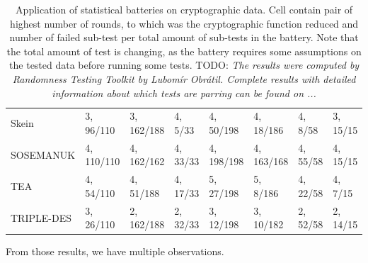 \documentclass[
  print, %
  Table,   %
  nolof,     %
  nolot,     %
  11pt, %
  oneside  %
]{fithesis3}
\newcommand{\todo}[1]{TODO: \textit{#1}}
\begin{document}
\begin{table}[H]
\begin{tabular}{l|p{1.8cm} p{1.8cm} p{1.8cm} p{1.8cm} p{1.8cm} p{1.8cm} p{1.8cm}}
Skein       & 3, 96/110 & 3, 162/188& 4, 5/33           & 4, 50/198                 & 4, 18/186     & 4, 8/58           & 3, 15/15              \\
SOSEMANUK   & 4, 110/110& 4, 162/162& 4, 33/33          & 4, 198/198                & 4, 163/168    & 4, 55/58          & 4, 15/15              \\
TEA         & 4, 54/110 & 4, 51/188 & 4, 17/33          & 5, 27/198                 & 5, 8/186      & 4, 22/58          & 4, 7/15               \\
TRIPLE-DES  & 3, 26/110 & 2, 162/188& 2, 32/33          & 3, 12/198                 & 3, 10/182     & 2, 52/58          & 2, 14/15              
\end{tabular}
\caption{Application of statistical batteries on cryptographic data. Cell contain pair of highest number of rounds, to which was the cryptographic function reduced and number of failed sub-test per total amount of sub-tests in the battery. Note that the total amount of test is changing, as the battery requires some assumptions on the tested data before running some tests. \todo{The results were computed by Randomness Testing Toolkit by Lubomír Obrátil. Complete results with detailed information about which tests are parring can be found on ...}}
\label{table:res-batteries}
\end{table}

From those results, we have multiple observations.
\end{document}
